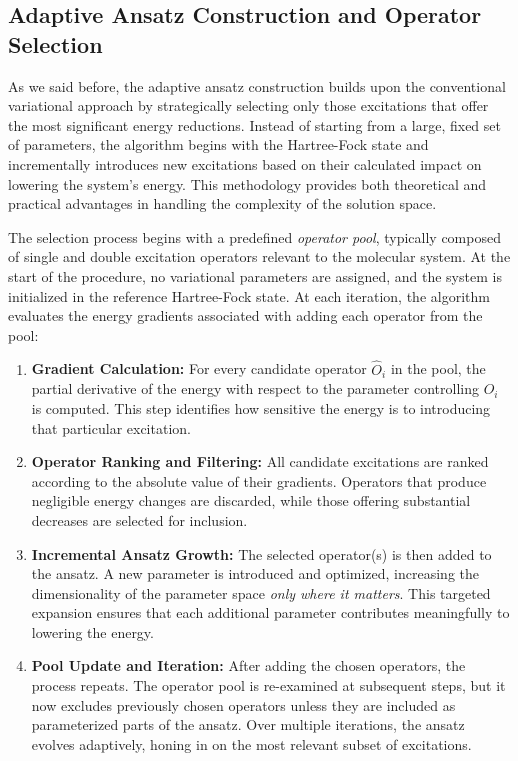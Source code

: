 \subsection{Adaptive Ansatz Construction and Operator Selection}

As we said before, the adaptive ansatz construction builds upon the conventional variational approach by strategically selecting only those excitations that offer the most significant energy reductions. Instead of starting from a large, fixed set of parameters, the algorithm begins with the Hartree-Fock state and incrementally introduces new excitations based on their calculated impact on lowering the system’s energy. This methodology provides both theoretical and practical advantages in handling the complexity of the solution space.

The selection process begins with a predefined \textit{operator pool}, typically composed of single and double excitation operators relevant to the molecular system. At the start of the procedure, no variational parameters are assigned, and the system is initialized in the reference Hartree-Fock state. At each iteration, the algorithm evaluates the energy gradients associated with adding each operator from the pool:

\begin{enumerate}
    \item \textbf{Gradient Calculation:} For every candidate operator $\hat{O}_i$ in the pool, the partial derivative of the energy with respect to the parameter controlling $\hat{O}_i$ is computed. This step identifies how sensitive the energy is to introducing that particular excitation.
    \item \textbf{Operator Ranking and Filtering:} All candidate excitations are ranked according to the absolute value of their gradients. Operators that produce negligible energy changes are discarded, while those offering substantial decreases are selected for inclusion.
    \item \textbf{Incremental Ansatz Growth:} The selected operator(s) is then added to the ansatz. A new parameter is introduced and optimized, increasing the dimensionality of the parameter space \emph{only where it matters}. This targeted expansion ensures that each additional parameter contributes meaningfully to lowering the energy.
    \item \textbf{Pool Update and Iteration:} After adding the chosen operators, the process repeats. The operator pool is re-examined at subsequent steps, but it now excludes previously chosen operators unless they are included as parameterized parts of the ansatz. Over multiple iterations, the ansatz evolves adaptively, honing in on the most relevant subset of excitations.
\end{enumerate}

